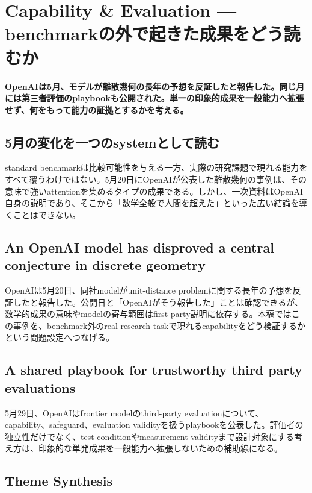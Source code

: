 \section{Capability \& Evaluation — benchmarkの外で起きた成果をどう読むか}
\label{pkg:capability-evaluation-may}
\noindent\textbf{OpenAIは5月、モデルが離散幾何の長年の予想を反証したと報告した。同じ月には第三者評価のplaybookも公開された。単一の印象的成果を一般能力へ拡張せず、何をもって能力の証拠とするかを考える。}\autocite{src-1c93d6c1c725,src-8c84b8422093}

\subsection{5月の変化を一つのsystemとして読む}

standard benchmarkは比較可能性を与える一方、実際の研究課題で現れる能力をすべて覆うわけではない。5月20日にOpenAIが公表した離散幾何の事例は、その意味で強いattentionを集めるタイプの成果である。しかし、一次資料はOpenAI自身の説明であり、そこから「数学全般で人間を超えた」といった広い結論を導くことはできない。\autocite{src-1c93d6c1c725,src-8c84b8422093}


\subsection{An OpenAI model has disproved a central conjecture in discrete geometry}

OpenAIは5月20日、同社modelがunit-distance problemに関する長年の予想を反証したと報告した。公開日と「OpenAIがそう報告した」ことは確認できるが、数学的成果の意味やmodelの寄与範囲はfirst-party説明に依存する。本稿ではこの事例を、benchmark外のreal research taskで現れるcapabilityをどう検証するかという問題設定へつなげる。\autocite{src-1c93d6c1c725}


\subsection{A shared playbook for trustworthy third party evaluations}

5月29日、OpenAIはfrontier modelのthird-party evaluationについて、capability、safeguard、evaluation validityを扱うplaybookを公表した。評価者の独立性だけでなく、test conditionやmeasurement validityまで設計対象にする考え方は、印象的な単発成果を一般能力へ拡張しないための補助線になる。\autocite{src-8c84b8422093}


\subsection{Theme Synthesis}

